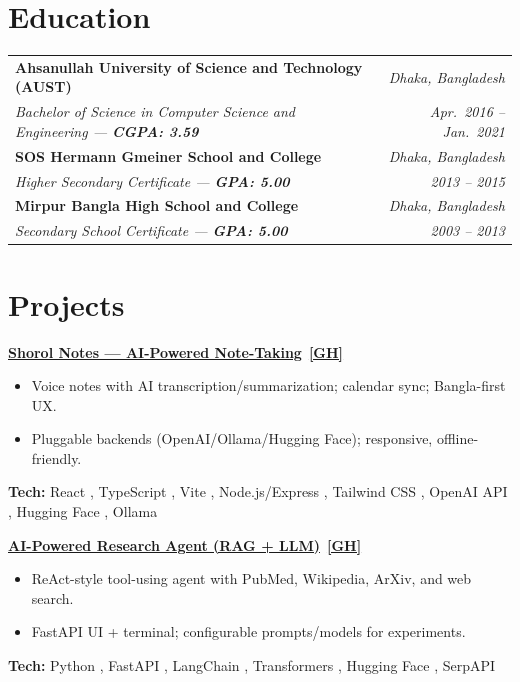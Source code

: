 \documentclass[10pt,letterpaper]{article}
\newcommand{\pill}[1]{%
  \begingroup\setlength{\fboxsep}{1.2pt}%
  \colorbox{brandblue!12}{\textcolor{brandblue}{\scriptsize #1}}%
  \endgroup
}
\newenvironment{project}{%
  \begin{tcolorbox}[
    enhanced,breakable,
    colback=white,colframe=white,
    borderline west={0.8pt}{0pt}{rail}, %
    left=10pt,right=0pt,top=2pt,bottom=2pt,
    boxsep=0pt,arc=0pt,outer arc=0pt,
    before skip=10pt,after skip=10pt
  ]%
  \setlength{\parskip}{6pt}\setlength{\parindent}{0pt}%
}{\end{tcolorbox}}
\newcommand{\ghicon}{\ifdefined\faGithub \faGithub \else \textbf{[GH]} \fi}
\newenvironment{projlist}{\begin{itemize}[leftmargin=*,nosep,topsep=0pt]\setlength{\itemsep}{1pt}}{\end{itemize}}
\newcommand{\ProjectHeading}[2]{\textbf{\href{#2}{#1}}\ \href{#2}{\ghicon}}
\begin{document}

\section{Education}

\begin{tabularx}{\linewidth}{@{}X r@{}}
\textbf{Ahsanullah University of Science and Technology (AUST)} & \textit{Dhaka, Bangladesh} \\
\textit{Bachelor of Science in Computer Science and Engineering — \textbf{CGPA: 3.59}} & \textit{Apr.\ 2016 -- Jan.\ 2021} \\
[6pt]
\textbf{SOS Hermann Gmeiner School and College} & \textit{Dhaka, Bangladesh} \\
\textit{Higher Secondary Certificate — \textbf{GPA: 5.00}} & \textit{2013 -- 2015} \\
[6pt]
\textbf{Mirpur Bangla High School and College} & \textit{Dhaka, Bangladesh} \\
\textit{Secondary School Certificate — \textbf{GPA: 5.00}} & \textit{2003 -- 2013} \\
\end{tabularx}


\section{Projects}

\begin{project}
  \ProjectHeading{Shorol Notes — AI-Powered Note-Taking}{http://v1nay.is-a.dev/}
  \begin{projlist}
    \item Voice notes with AI transcription/summarization; calendar sync; Bangla-first UX.
    \item Pluggable backends (OpenAI/Ollama/Hugging Face); responsive, offline-friendly.
  \end{projlist}
  {\footnotesize \textbf{Tech:} \pill{React}, \pill{TypeScript}, \pill{Vite}, \pill{Node.js/Express}, \pill{Tailwind CSS}, \pill{OpenAI API}, \pill{Hugging Face}, \pill{Ollama}}
\end{project}

\begin{project}
  \ProjectHeading{AI-Powered Research Agent (RAG + LLM)}{http://v1nay.is-a.dev/}
  \begin{projlist}
    \item ReAct-style tool-using agent with PubMed, Wikipedia, ArXiv, and web search.
    \item FastAPI UI + terminal; configurable prompts/models for experiments.
  \end{projlist}
  {\footnotesize \textbf{Tech:} \pill{Python}, \pill{FastAPI}, \pill{LangChain}, \pill{Transformers}, \pill{Hugging Face}, \pill{SerpAPI}}
\end{project}
\end{document}

